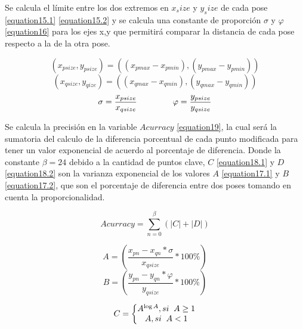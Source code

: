Se calcula el límite entre los dos extremos en $x_size$ y $y_size$ de cada pose \ref{equation15.1} \ref{equation15.2} y se calcula una constante de proporción $\sigma$ y $\varphi$ \ref{equation16} para los ejes x,y que permitirá comparar la distancia de cada pose respecto a la de la otra pose.

\begin{equation}
(x_{psize},y_{psize}) = ((x_{pmax}-x_{pmin}),(y_{pmax}-y_{pmin}))
\label{equation15.1}
\end{equation}
\begin{equation}
(x_{qsize},y_{qize}) = ((x_{qmax}-x_{qmin}),(y_{qmax}-y_{qmin}))
\label{equation15.2}
\end{equation}
\begin{equation}
\sigma = \frac{x_{psize}}{x_{qsize}} \hspace{15mm} \varphi = \frac{y_{psize}}{y_{qsize}}  
\label{equation16}
\end{equation}

Se calcula la precisión en la variable $Acurracy$ \ref{equation19}, la cual será la sumatoria del calculo de la diferencia porcentual de cada punto modificada para tener un valor exponencial de acuerdo al porcentaje de diferencia. Donde la constante $\beta = 24$ debido a la cantidad de puntos clave, $C$ \ref{equation18.1} y $D$ \ref{equation18.2} son la varianza exponencial de los valores $A$ \ref{equation17.1} y $B$ \ref{equation17.2}, que son el porcentaje de diferencia entre dos poses tomando en cuenta la proporcionalidad.

\begin{equation}
Acurracy = \sum_{n=0}^\beta (\left | C \right |  +  \left |  D \right |) 
\label{equation19}
\end{equation}

\begin{equation}
A=(\frac{x_{pn}-x_{qn}*\sigma}{x_{qsize}} *100 \% )
\label{equation17.1}
\end{equation}
\begin{equation}
B=(\frac{y_{pn}-y_{qn}*\varphi}{y_{qsize}} *100 \% )
\label{equation17.2}
\end{equation}

\begin{equation}
C=\left\{\begin{matrix}
A^{\log A} , si \hspace{2mm} A \geq 1  \\
A , si \hspace{2mm} A <  1
\end{matrix}\right. 
\label{equation18.1}
\end{equation}

